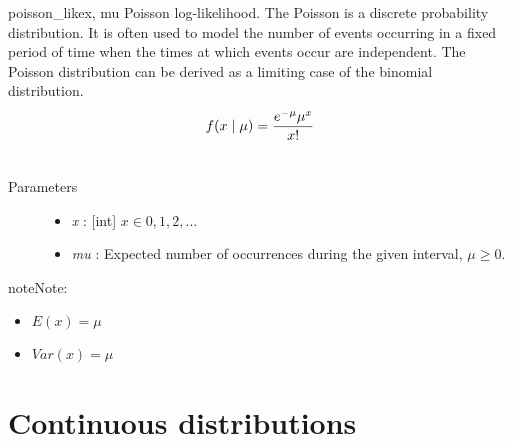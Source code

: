 \hypertarget{pymc.distributions.poisson_like}{}\begin{funcdesc}{poisson\_like}{x, mu}
Poisson log-likelihood. The Poisson is a discrete probability distribution.
It is often used to model the number of events occurring in a fixed period of
time when the times at which events occur are independent. The Poisson
distribution can be derived as a limiting case of the binomial distribution.
\begin{gather}
\begin{split}f(x \mid \mu) = \frac{e^{-\mu}\mu^x}{x!}\end{split}\notag\\\begin{split}\end{split}\notag
\end{gather}\begin{description}
\item[Parameters] \leavevmode\begin{itemize}
\item {} 
\emph{x} : {[}int{]} $x \in {0,1,2,...}$

\item {} 
\emph{mu} : Expected number of occurrences during the given interval, $\mu \geq 0$.

\end{itemize}

\end{description}

\begin{notice}{note}{Note:}\begin{itemize}
\item {} 
$E(x)=\mu$

\item {} 
$Var(x)=\mu$

\end{itemize}
\end{notice}
\end{funcdesc}


\section{Continuous distributions}

